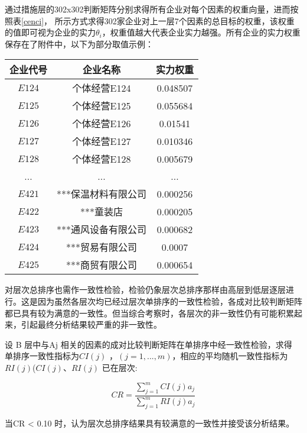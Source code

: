 \documentclass{cumcmthesis}
\begin{document}
通过措施层的302x302判断矩阵分别求得所有企业对每个因素的权重向量，进而按照表\ref{cenci}，
所示方式求得302家企业对上一层7个因素的总目标的权重，该权重的值即可视为企业的实力$\theta_i$，权重值越大代表企业实力越强。所有企业的实力权重保存在了附件中，以下为部分取值示例：

\begin{table}[H]
    \begin{center}
    \begin{tabular}{|c|c|c|}
        \hline
    企业代号 & 企业名称 & 实力权重\\
    \hline
    $E124$ & 个体经营E124 & 0.048507\\
    $E125$ & 个体经营E125 & 0.055684\\
    $E126$ & 个体经营E126 & 0.01541\\
    $E127$ & 个体经营E127 & 0.010346\\
    $E128$ & 个体经营E128 & 0.005679\\
    ... & ... & ...\\
    $E421$ & ***保温材料有限公司 & 0.000256\\
    $E422$ & ***童装店          & 0.000205\\
    $E423$ & ***通风设备有限公司 & 0.000682\\
    $E424$ & ***贸易有限公司 & 0.0007\\
    $E425$ & ***商贸有限公司 & 0.000654\\
    \hline
    \end{tabular}
    \end{center}
    \end{table}

对层次总排序也需作一致性检验，检验仍象层次总排序那样由高层到低层逐层进行。这是因为虽然各层次均已经过层次单排序的一致性检验，各成对比较判断矩阵都已具有较为满意的一致性。但当综合考察时，各层次的非一致性仍有可能积累起来，引起最终分析结果较严重的非一致性。

设 B 层中与Aj 相关的因素的成对比较判断矩阵在单排序中经一致性检验，求得
单排序一致性指标为$CI\left(j\right)$ ，$\left(j = 1,...,m\right)$，相应的平均随机一致性指标为 $RI\left(j\right)$($CI\left(j\right)$、$RI\left(j\right)$ 已在层次:


\begin{equation}
    CR = \frac{\sum^{m}_{j=1}CI\left(j\right)a_j}{\sum^{m}_{j=1}RI\left(j\right)a_j}
\end{equation}

当CR < 0.10 时，认为层次总排序结果具有较满意的一致性并接受该分析结果。 
\end{document}
